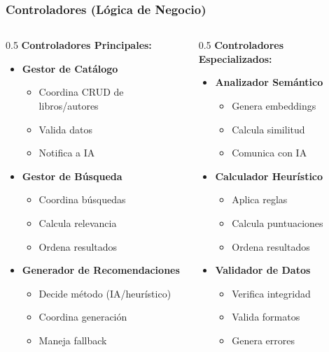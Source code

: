 \documentclass[aspectratio=169]{beamer}
\begin{document}
\begin{frame}
\frametitle{Controladores (Lógica de Negocio)}

\begin{columns}
\begin{column}{0.5\textwidth}
\textbf{Controladores Principales:}
\begin{itemize}
\item \textbf{Gestor de Catálogo}
  \begin{itemize}
  \item Coordina CRUD de libros/autores
  \item Valida datos
  \item Notifica a IA
  \end{itemize}
\item \textbf{Gestor de Búsqueda}
  \begin{itemize}
  \item Coordina búsquedas
  \item Calcula relevancia
  \item Ordena resultados
  \end{itemize}
\item \textbf{Generador de Recomendaciones}
  \begin{itemize}
  \item Decide método (IA/heurístico)
  \item Coordina generación
  \item Maneja fallback
  \end{itemize}
\end{itemize}
\end{column}

\begin{column}{0.5\textwidth}
\textbf{Controladores Especializados:}
\begin{itemize}
\item \textbf{Analizador Semántico}
  \begin{itemize}
  \item Genera embeddings
  \item Calcula similitud
  \item Comunica con IA
  \end{itemize}
\item \textbf{Calculador Heurístico}
  \begin{itemize}
  \item Aplica reglas
  \item Calcula puntuaciones
  \item Ordena resultados
  \end{itemize}
\item \textbf{Validador de Datos}
  \begin{itemize}
  \item Verifica integridad
  \item Valida formatos
  \item Genera errores
  \end{itemize}
\end{itemize}
\end{column}
\end{columns}

\end{frame}
\end{document}
